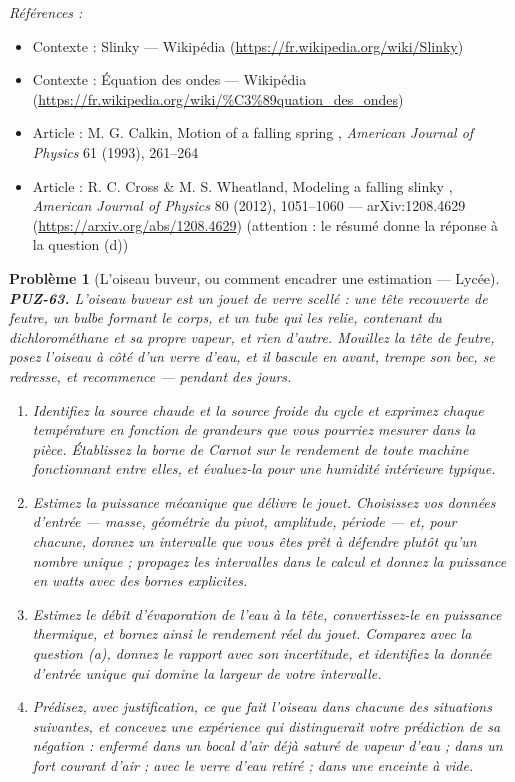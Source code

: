 \documentclass[11pt]{article}
\newtheorem{problem}{Problème}
\newenvironment{refs}{\par\small\noindent\emph{Références :}\begin{itemize}\setlength\itemsep{0pt}}{\end{itemize}\normalsize}
\begin{document}
\begin{refs}
\item Contexte : Slinky --- Wikipédia (\url{https://fr.wikipedia.org/wiki/Slinky})
\item Contexte : Équation des ondes --- Wikipédia (\url{https://fr.wikipedia.org/wiki/%C3%89quation_des_ondes})
\item Article : M. G. Calkin, \og{} Motion of a falling spring \fg{}, \textit{American Journal of Physics} 61 (1993), 261--264
\item Article : R. C. Cross \& M. S. Wheatland, \og{} Modeling a falling slinky \fg{}, \textit{American Journal of Physics} 80 (2012), 1051--1060 --- arXiv:1208.4629 (\url{https://arxiv.org/abs/1208.4629}) (attention : le résumé donne la réponse à la question (d))
\end{refs}

\bigskip

\begin{problem}[{L'oiseau buveur, ou comment encadrer une estimation --- Lycée}]
\textbf{PUZ-63.} L'oiseau buveur est un jouet de verre scellé : une tête recouverte de
feutre, un bulbe formant le corps, et un tube qui les relie, contenant du dichlorométhane et
sa propre vapeur, et rien d'autre. Mouillez la tête de feutre, posez l'oiseau à côté d'un
verre d'eau, et il bascule en avant, trempe son bec, se redresse, et recommence --- pendant
des jours.
\begin{enumerate}
\item[(a)] Identifiez la source chaude et la source froide du cycle et exprimez chaque température
en fonction de grandeurs que vous pourriez mesurer dans la pièce. Établissez la borne de
Carnot sur le rendement de toute machine fonctionnant entre elles, et évaluez-la pour une
humidité intérieure typique.
\item[(b)] Estimez la puissance mécanique que délivre le jouet. Choisissez vos données d'entrée ---
masse, géométrie du pivot, amplitude, période --- et, pour chacune, donnez un intervalle que
vous êtes prêt à défendre plutôt qu'un nombre unique ; propagez les intervalles dans le
calcul et donnez la puissance en watts avec des bornes explicites.
\item[(c)] Estimez le débit d'évaporation de l'eau à la tête, convertissez-le en puissance
thermique, et bornez ainsi le rendement réel du jouet. Comparez avec la question (a),
donnez le rapport avec son incertitude, et identifiez la donnée d'entrée unique qui domine
la largeur de votre intervalle.
\item[(d)] Prédisez, avec justification, ce que fait l'oiseau dans chacune des situations
suivantes, et concevez une expérience qui distinguerait votre prédiction de sa négation :
enfermé dans un bocal d'air déjà saturé de vapeur d'eau ; dans un fort courant d'air ; avec
le verre d'eau retiré ; dans une enceinte à vide.
\end{enumerate}

\end{problem}
\end{document}
